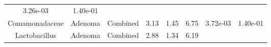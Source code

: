 \documentclass[12pt,]{article}
\begin{document}
\begin{longtable}[]{@{}cccccccc@{}}
\begin{minipage}[t]{0.06\columnwidth}
3.26e-03\strut
\end{minipage} & \begin{minipage}[t]{0.06\columnwidth}\centering\strut
1.40e-01\strut
\end{minipage}\tabularnewline
\begin{minipage}[t]{0.19\columnwidth}\centering\strut
Comamonadaceae\strut
\end{minipage} & \begin{minipage}[t]{0.07\columnwidth}\centering\strut
Adenoma\strut
\end{minipage} & \begin{minipage}[t]{0.09\columnwidth}\centering\strut
Combined\strut
\end{minipage} & \begin{minipage}[t]{0.03\columnwidth}\centering\strut
3.13\strut
\end{minipage} & \begin{minipage}[t]{0.14\columnwidth}\centering\strut
1.45\strut
\end{minipage} & \begin{minipage}[t]{0.14\columnwidth}\centering\strut
6.75\strut
\end{minipage} & \begin{minipage}[t]{0.06\columnwidth}\centering\strut
3.72e-03\strut
\end{minipage} & \begin{minipage}[t]{0.06\columnwidth}\centering\strut
1.40e-01\strut
\end{minipage}\tabularnewline
\begin{minipage}[t]{0.19\columnwidth}\centering\strut
Lactobacillus\strut
\end{minipage} & \begin{minipage}[t]{0.07\columnwidth}\centering\strut
Adenoma\strut
\end{minipage} & \begin{minipage}[t]{0.09\columnwidth}\centering\strut
Combined\strut
\end{minipage} & \begin{minipage}[t]{0.03\columnwidth}\centering\strut
2.88\strut
\end{minipage} & \begin{minipage}[t]{0.14\columnwidth}\centering\strut
1.34\strut
\end{minipage} & \begin{minipage}[t]{0.14\columnwidth}\centering\strut
6.19\strut
\end{minipage} & \begin{minipage}[t]{0.06\columnwidth}\centering\strut

\end{minipage}
\end{longtable}
\end{document}
